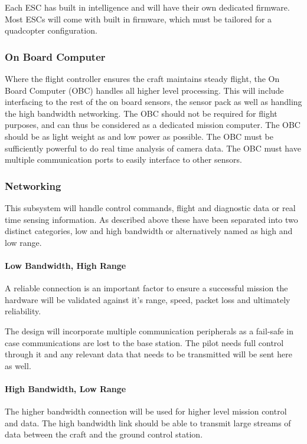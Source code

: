 			Each ESC has built in intelligence and will have their own dedicated firmware. Most ESCs will come with built in firmware, which must be tailored for a quadcopter configuration.
			
			\subsubsection{On Board Computer}
			Where the flight controller ensures the craft maintains steady flight, the On Board Computer (OBC) handles all higher level processing. This will include interfacing to the rest of the on board sensors, the sensor pack as well as handling the high bandwidth networking. The OBC should not be required for flight purposes, and can thus be considered as a dedicated mission computer. 
			The OBC should be as light weight as and low power as possible. The OBC must be sufficiently powerful to do real time analysis of camera data. The OBC must have multiple communication ports to easily interface to other sensors.
					
			\subsubsection{Networking}
			This subsystem will handle control commands, flight and diagnostic data or real time sensing information. As described above these have been separated into two distinct categories, low and high bandwidth or alternatively named as high and low range. 
			
				\paragraph{Low Bandwidth, High Range}
				A reliable connection is an important factor to ensure a successful mission the hardware will be validated against it's range, speed, packet loss and ultimately reliability.
						
				The design will incorporate multiple communication peripherals as a fail-safe in case communications are lost to the base station. The pilot needs full control through it and any relevant data that needs to be transmitted will be sent here as well.
						
				\paragraph{High Bandwidth, Low Range}
				The higher bandwidth connection will be used for higher level mission control and data. The high bandwidth link should be able to transmit large streams of data between the craft and the ground control station. 
			
